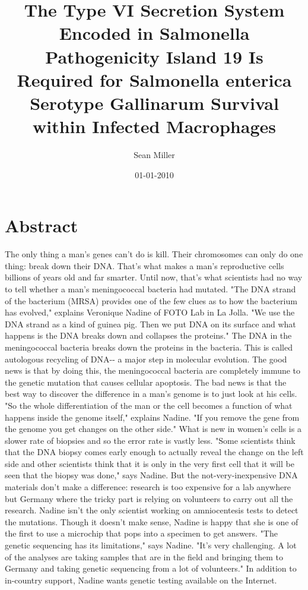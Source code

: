 \documentclass{article}%
\title{The Type VI Secretion System Encoded in Salmonella Pathogenicity Island 19 Is Required for Salmonella enterica Serotype Gallinarum Survival within Infected Macrophages}%
\author{Sean Miller}%
\affil{Department of Biochemistry and Molecular Biology and the Massey Cancer Center, Virginia Commonwealth University School of Medicine, Richmond, VA 23298, USA.}%
\date{01{-}01{-}2010}%
\begin{document}
%
\normalsize%
\maketitle%
\section{Abstract}%
\label{sec:Abstract}%
The only thing a man's genes can't do is kill. Their chromosomes can only do one thing: break down their DNA. That's what makes a man's reproductive cells billions of years old and far smarter.\newline%
Until now, that's what scientists had no way to tell whether a man's meningococcal bacteria had mutated.\newline%
"The DNA strand of the bacterium (MRSA) provides one of the few clues as to how the bacterium has evolved," explains Veronique Nadine of FOTO Lab in La Jolla. "We use the DNA strand as a kind of guinea pig. Then we put DNA on its surface and what happens is the DNA breaks down and collapses the proteins."\newline%
The DNA in the meningococcal bacteria breaks down the proteins in the bacteria. This is called autologous recycling of DNA{-}{-} a major step in molecular evolution.\newline%
The good news is that by doing this, the meningococcal bacteria are completely immune to the genetic mutation that causes cellular apoptosis.\newline%
The bad news is that the best way to discover the difference in a man's genome is to just look at his cells.\newline%
"So the whole differentiation of the man or the cell becomes a function of what happens inside the genome itself," explains Nadine. "If you remove the gene from the genome you get changes on the other side."\newline%
What is new in women's cells is a slower rate of biopsies and so the error rate is vastly less.\newline%
"Some scientists think that the DNA biopsy comes early enough to actually reveal the change on the left side and other scientists think that it is only in the very first cell that it will be seen that the biopsy was done," says Nadine.\newline%
But the not{-}very{-}inexpensive DNA materials don't make a difference: research is too expensive for a lab anywhere but Germany where the tricky part is relying on volunteers to carry out all the research.\newline%
Nadine isn't the only scientist working on amniocentesis tests to detect the mutations.\newline%
Though it doesn't make sense, Nadine is happy that she is one of the first to use a microchip that pops into a specimen to get answers.\newline%
"The genetic sequencing has its limitations," says Nadine. "It's very challenging. A lot of the analyses are taking samples that are in the field and bringing them to Germany and taking genetic sequencing from a lot of volunteers."\newline%
In addition to in{-}country support, Nadine wants genetic testing available on the Internet.
\end{document}

